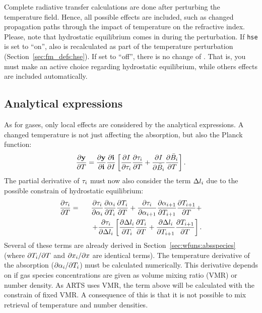 Complete radiative transfer calculations are done after perturbing the
temperature field. Hence, all possible effects are included, such as changed
propagation paths through the impact of temperature on the refractive index.
Please, note that hydrostatic equilibrium comes in during the perturbation. If
\verb|hse| is set to ``on'', also  is recalculated as part
of the temperature perturbation (Section~\ref{sec:fm_defs:hse}). If set to
``off'', there is no change of . That is, you must make an
active choice regarding hydrostatic equilibrium, while others effects are
included automatically.


\subsection{Analytical expressions}
%
As for gases, only local effects are considered by the analytical expressions.
A changed temperature is not just affecting the absorption, but also the Planck
function:
\begin{equation}
  \frac{\partial \mathbf{y}}{\partial T} =  
  \frac{\partial \mathbf{y}}{\partial \mathbf{i}} \frac{\partial \mathbf{i}}{\partial I} 
  \left[
  \frac{\partial I}{\partial \tau_{i}}\frac{\partial \tau_{i}}{\partial T} + 
  \frac{\partial I}{\partial \bar{B}_i}
  \frac{\partial \bar{B}_i}{\partial T} \right].
 \label{eq:wfuns:t1}
\end{equation}
The partial derivative of $\tau_{i}$ must now also consider the term $\Delta
l_{i}$ due to the possible constrain of hydrostatic equilibrium:
\begin{eqnarray}
  \frac{\partial \tau_{i}}{\partial T} &=&
  \frac{\partial \tau_{i}}{\partial {\alpha}_{i}}
  \frac{\partial {\alpha}_{i}}{\partial T_{i}} 
  \frac{\partial T_{i}}{\partial T} +
  \frac{\partial \tau_{i}}{\partial {\alpha}_{i+1}}
  \frac{\partial {\alpha}_{i+1}}{\partial T_{i+1}}
  \frac{\partial T_{i+1}}{\partial T} + \nonumber \\ &&
  \quad + \frac{\partial \tau_{i}}{\partial \Delta l_{i}}
  \left[
    \frac{\partial \Delta l_{i}}{\partial T_{i}} \frac{\partial T_i}{\partial T} +
    \frac{\partial \Delta l_{i}}{\partial T_{i+1}} \frac{\partial T_{i+1}}{\partial T}
  \right].
\end{eqnarray}
Several of these terms are already derived in
Section~\ref{sec:wfuns:absspecies} (where $\partial T_{i}/\partial T$ and
$\partial x_{i}/\partial x$ are identical terms). The temperature
derivative of the absorption ($\partial{\alpha}_{i}/\partial T_{i}$) must be
calculated numerically. This derivative depends on if gas species
concentrations are given as volume mixing ratio (VMR) or number density. As
ARTS uses VMR, the term above will be calculated with the constrain of fixed
VMR. A consequence of this is that it is not possible to mix retrieval of
temperature and number densities.

